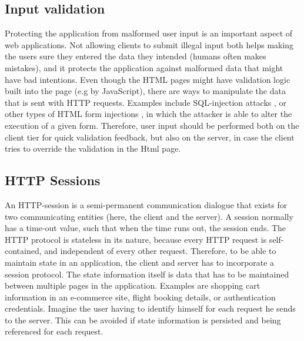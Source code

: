 \subsection {Input validation}
Protecting the application from malformed user input is an important aspect of web applications. Not allowing clients to submit illegal input both helps making the users sure they entered the data they intended (humans often makes mistakes), and it protects the application against malformed data that might have bad intentions. Even though the HTML pages might have validation logic built into the page (e.g by JavaScript), there are ways to manipulate the data that is sent with HTTP requests. Examples include SQL-injection attacks \cite{sqlinjection}, or other types of HTML form injections \cite{htmlinjection}, in which the attacker is able to alter the execution of a given form. Therefore, user input should be performed both on the client tier for quick validation feedback, but also on the server, in case the client tries to override the validation in the Html page. 

\subsection{HTTP Sessions}
An HTTP-session is a semi-permanent communication dialogue that exists for two communicating entities (here, the client and the server). A session normally has a time-out value, such that when the time runs out, the session ends. The HTTP protocol is stateless in its nature, because every HTTP request is self-contained, and independent of every other request. Therefore, to be able to maintain state in an application, the client and server has to incorporate a session protocol. The state information itself is data that has to be maintained between multiple pages in the application. Examples are shopping cart information in an e-commerce site, flight booking details, or authentication credentials. Imagine the user having to identify himself for each request he sends to the server. This can be avoided if state information is persisted and being referenced for each request. 

